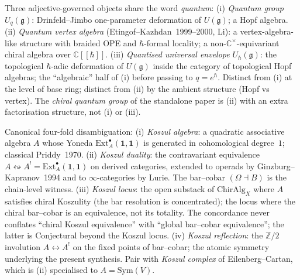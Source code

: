 \begin{description}[itemsep=4pt, leftmargin=2.0em, style=nextline]
\item[T13 (``quantum''--three distinct categories of object).]
%
Three adjective-governed objects share the word \emph{quantum}:
(i) \emph{Quantum group} $U_q(\mathfrak g)$: Drinfeld--Jimbo
one-parameter deformation of $U(\mathfrak g)$; a Hopf algebra.
(ii) \emph{Quantum vertex algebra}
(Etingof--Kazhdan~1999--2000, Li): a vertex-algebra-like structure
with braided OPE and $\hbar$-formal locality; a
non-$\mathbb C^\times$-equivariant chiral algebra over
$\mathbb C[[\hbar]]$.
(iii) \emph{Quantised universal envelope}
$U_\hbar(\mathfrak g)$: the topological $\hbar$-adic deformation of
$U(\mathfrak g)$ inside the category of topological Hopf algebras;
the ``algebraic'' half of (i) before passing to $q = e^\hbar$.
Distinct from (i) at the level of base ring; distinct from (ii) by
the ambient structure (Hopf vs vertex). The
\emph{chiral quantum group} of the standalone paper is
(ii) with an extra factorisation structure, not (i) or (iii).

\item[T14 (``Koszul''--four distinct nouns).]
%
Canonical four-fold disambiguation:
(i) \emph{Koszul algebra}: a quadratic associative algebra $A$ whose
Yoneda $\mathrm{Ext}^\bullet_A(\mathbf 1, \mathbf 1)$ is generated
in cohomological degree~$1$; classical Priddy~1970.
(ii) \emph{Koszul duality}: the contravariant equivalence
$A \leftrightsquigarrow A^! = \mathrm{Ext}^\bullet_A(\mathbf 1,
\mathbf 1)$ on derived categories, extended to operads by
Ginzburg--Kapranov~1994 and to $\infty$-categories by Lurie. The
bar--cobar $(\Omega \dashv B)$ is the chain-level
witness.
(iii) \emph{Koszul locus}: the open substack of
$\mathrm{ChirAlg}_X$ where $A$ satisfies chiral Koszulity (the
bar resolution is concentrated); the locus where the chiral
bar--cobar is an equivalence, not its totality. The concordance
never conflates ``chiral Koszul equivalence'' with ``global bar--cobar
equivalence''; the latter is Conjectural beyond the Koszul locus.
(iv) \emph{Koszul reflection}: the $\mathbb Z/2$ involution
$A \leftrightarrow A^!$ on the fixed points of bar--cobar; the
atomic symmetry underlying the present synthesis.
Pair with \emph{Koszul complex} of Eilenberg--Cartan, which is
(ii) specialised to $A = \mathrm{Sym}(V)$.


\end{description}
